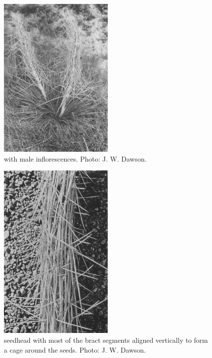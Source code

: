\begin{figure}
	\includegraphics[width=0.5\textwidth]{graphics/figure84aciphylla.jpg}
	\centering
	\caption[\emph{Aciphylla subflabellata with male inflorescencs}]{ with male inflorescences.
	Photo:  J. W. Dawson.}%
	\label{fig:84aciphylla}
\end{figure}

\begin{figure}
	\includegraphics[width=0.5\textwidth]{graphics/figure85aciphylla-seedhead.jpg}
	\centering
	\caption[\emph{Aciphylla subflabellata} seedhead]{ seedhead with most of the bract segments aligned vertically to form a cage around the seeds.
	Photo:  J. W. Dawson.}%
	\label{fig:85aciphylla-seedhead}
\end{figure}

